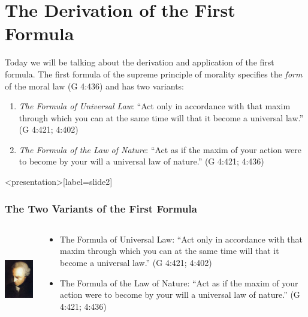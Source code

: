 
\section{The Derivation of the First Formula}\label{sec:the_derivation} %

Today we will be talking about the derivation and application of the first formula. The first formula of the supreme principle of morality specifies the \emph{form} of the moral law (G 4:436) and has two variants:

\begin{enumerate}
	\item \emph{The Formula of Universal Law}: ``Act only in accordance with that maxim through which you can at the same time will that it become a universal law.'' (G 4:421; 4:402)
    \item \emph{The Formula of the Law of Nature}: ``Act as if the maxim of your action were to become by your will a universal law of nature.'' (G 4:421; 4:436)
\end{enumerate}

\change

\begin{frame}<presentation>[label=slide2]
    \frametitle{The Two Variants of the First Formula}
        \begin{columns}
            \begin{column}{3cm}
                \includegraphics[height=4cm]{../../graphics/kant.jpg}
            \end{column}
            \begin{column}{7cm}
                \begin{itemize}
                	\item \alert{The Formula of Universal Law}: ``Act only in accordance with that maxim through which you can at the same time will that it become a universal law.'' (G 4:421; 4:402)
                    \item \alert{The Formula of the Law of Nature}: ``Act as if the maxim of your action were to become by your will a universal law of nature.'' (G 4:421; 4:436)
                \end{itemize}
            \end{column}
        \end{columns}
\end{frame}

